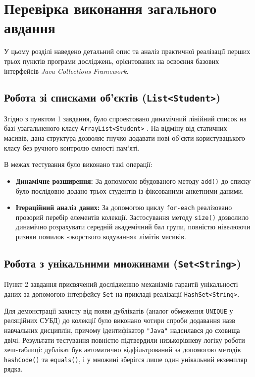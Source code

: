 \section{Перевірка виконання загального авдання}

У цьому розділі наведено детальний опис та аналіз практичної реалізації 
перших трьох пунктів програми досліджень, орієнтованих на освоєння базових 
інтерфейсів \textit{Java Collections Framework}.

\subsection{Робота зі списками об'єктів (\texttt{List<Student>})}

Згідно з пунктом 1 завдання, було спроектовано динамічний лінійний список 
на базі узагальненого класу \texttt{ArrayList<Student>}
. На відміну 
від статичних масивів, дана структура дозволяє гнучко додавати нові об'єкти 
користувацького класу без ручного контролю ємності пам'яті. 

В межах тестування було виконано такі операції:
\begin{itemize}
    \item \textbf{Динамічне розширення:} 
    За допомогою вбудованого методу \texttt{add()} до списку було послідовно 
    додано трьох студентів із фіксованими анкетними даними.
    \item \textbf{Ітераційний аналіз даних:} 
    За допомогою циклу \texttt{for-each} реалізовано прозорий перебір елементів 
    колекції. Застосування методу \texttt{size()} дозволило динамічно 
    розрахувати середній академічний бал групи, повністю нівелюючи ризики 
    помилок «жорсткого кодування» лімітів масивів.
\end{itemize}

\subsection{Робота з унікальними множинами (\texttt{Set<String>})}

Пункт 2 завдання присвячений дослідженню механізмів гарантії унікальності даних 
за допомогою інтерфейсу \texttt{Set} на прикладі реалізації \texttt{HashSet<String>}. 

Для демонстрації захисту від появи дублікатів (аналог обмеження \texttt{UNIQUE} 
у реляційних СУБД) до колекції було виконано чотири спроби додавання назв навчальних 
дисциплін, причому ідентифікатор \texttt{"Java"} надсилався до сховища двічі. 
Результати тестування повністю підтвердили низькорівневу логіку роботи хеш-таблиці: 
дублікат був автоматично відфільтрований за допомогою методів \texttt{hashCode()} 
та \texttt{equals()}, і у множині зберігся лише один унікальний екземпляр 
рядка.

